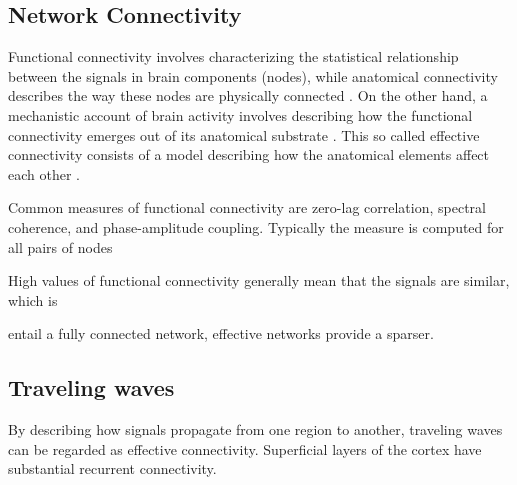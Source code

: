 
\subsection*{Network Connectivity}
Functional connectivity involves characterizing the statistical relationship between the signals in brain components (nodes), while anatomical connectivity describes the way these nodes are physically connected \citep{Rubinov2010}. On the other hand, a mechanistic account of brain activity involves describing how the functional connectivity emerges out of its anatomical substrate \citep{Honey2009}. This so called effective connectivity consists of a model describing how the anatomical elements affect each other \citep{Bullmore2009}.

Common measures of functional connectivity are zero-lag correlation, spectral coherence, and phase-amplitude coupling. Typically the measure is computed for all pairs of nodes

High values of functional connectivity generally mean that the signals are similar, which is 

entail a fully connected network, effective networks provide a sparser.


\subsection*{Traveling waves}
By describing how signals propagate from one region to another, traveling waves can be regarded as effective connectivity. Superficial layers of the cortex have substantial recurrent connectivity.

